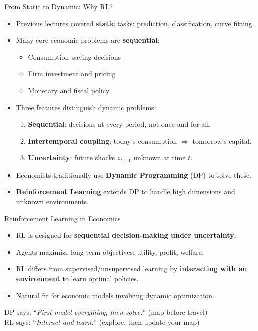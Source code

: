 \documentclass[10pt,english,aspectratio=169]{beamer}
\begin{document}
\begin{frame}{From Static to Dynamic: Why RL?}
\begin{itemize}
    \item Previous lectures covered \textbf{static} tasks: prediction, classification, curve fitting.
    \item Many core economic problems are \textbf{sequential}:
    \begin{itemize}
        \item Consumption--saving decisions
        \item Firm investment and pricing
        \item Monetary and fiscal policy
    \end{itemize}
    \item Three features distinguish dynamic problems:
    \begin{enumerate}
        \item \textbf{Sequential}: decisions at every period, not once-and-for-all.
        \item \textbf{Intertemporal coupling}: today's consumption $\Rightarrow$ tomorrow's capital.
        \item \textbf{Uncertainty}: future shocks $z_{t+1}$ unknown at time $t$.
    \end{enumerate}
    \item Economists traditionally use \textbf{Dynamic Programming} (DP) to solve these.
    \item \textbf{Reinforcement Learning} extends DP to handle high dimensions and unknown environments.
\end{itemize}
\end{frame}

\begin{frame}{Reinforcement Learning in Economics}
    \begin{itemize}
        \item RL is designed for \textbf{sequential decision-making under uncertainty}.
        \item Agents maximize long-term objectives: utility, profit, welfare.
        \item RL differs from supervised/unsupervised learning by \textbf{interacting with an environment} to learn optimal policies.
        \item Natural fit for economic models involving dynamic optimization.
    \end{itemize}

    \vspace{0.4cm}
    \begin{tcolorbox}[colback=VeryLightGray,colframe=RedTitle!60,title=Key Insight]
    DP says: ``\textit{First model everything, then solve.}'' (map before travel)\\
    RL says: ``\textit{Interact and learn.}'' (explore, then update your map)
    \end{tcolorbox}
\end{frame}
\end{document}
